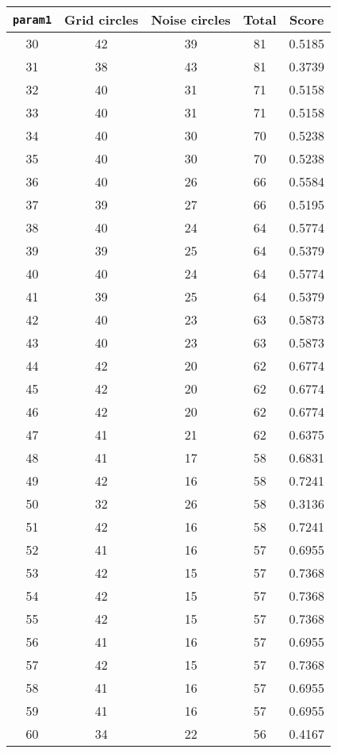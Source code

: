 \documentclass[letterpaper, 12pt]{article}
\begin{document}
\begin{longtable}{|c|c|c|c|c|}
\hline
\textbf{\texttt{param1}} & \textbf{Grid circles} & \textbf{Noise circles} & \textbf{Total} & \textbf{Score} \\
\hline
30 & 42 & 39 & 81 & 0.5185 \\
\hline
31 & 38 & 43 & 81 & 0.3739 \\
\hline
32 & 40 & 31 & 71 & 0.5158 \\
\hline
33 & 40 & 31 & 71 & 0.5158 \\
\hline
34 & 40 & 30 & 70 & 0.5238 \\
\hline
35 & 40 & 30 & 70 & 0.5238 \\
\hline
36 & 40 & 26 & 66 & 0.5584 \\
\hline
37 & 39 & 27 & 66 & 0.5195 \\
\hline
38 & 40 & 24 & 64 & 0.5774 \\
\hline
39 & 39 & 25 & 64 & 0.5379 \\
\hline
40 & 40 & 24 & 64 & 0.5774 \\
\hline
41 & 39 & 25 & 64 & 0.5379 \\
\hline
42 & 40 & 23 & 63 & 0.5873 \\
\hline
43 & 40 & 23 & 63 & 0.5873 \\
\hline
44 & 42 & 20 & 62 & 0.6774 \\
\hline
45 & 42 & 20 & 62 & 0.6774 \\
\hline
46 & 42 & 20 & 62 & 0.6774 \\
\hline
47 & 41 & 21 & 62 & 0.6375 \\
\hline
48 & 41 & 17 & 58 & 0.6831 \\
\hline
49 & 42 & 16 & 58 & 0.7241 \\
\hline
50 & 32 & 26 & 58 & 0.3136 \\
\hline
51 & 42 & 16 & 58 & 0.7241 \\
\hline
52 & 41 & 16 & 57 & 0.6955 \\
\hline
53 & 42 & 15 & 57 & 0.7368 \\
\hline
54 & 42 & 15 & 57 & 0.7368 \\
\hline
55 & 42 & 15 & 57 & 0.7368 \\
\hline
56 & 41 & 16 & 57 & 0.6955 \\
\hline
57 & 42 & 15 & 57 & 0.7368 \\
\hline
58 & 41 & 16 & 57 & 0.6955 \\
\hline
59 & 41 & 16 & 57 & 0.6955 \\
\hline
60 & 34 & 22 & 56 & 0.4167 \\

\end{longtable}
\end{document}
